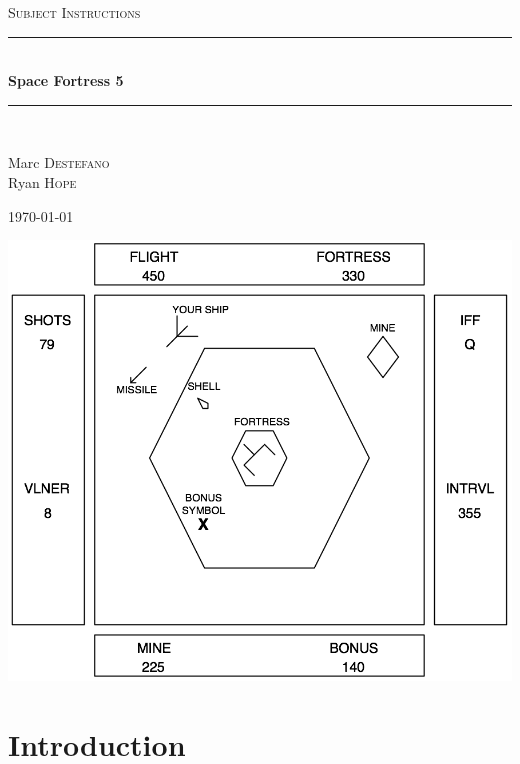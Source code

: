 \documentclass[letterpaper,12pt]{article}
\newcommand{\HRule}{\rule{\linewidth}{0.5mm}}
\begin{document}
\begin{titlepage}
\begin{center}
\null
\vfill
\textsc{\Large Subject Instructions}\\[0.5cm]
\HRule \\[0.7cm]
{ \huge \bfseries Space Fortress 5}\\[0.4cm]
\HRule \\[1.5cm]
\begin{minipage}{0.4\textwidth}
\begin{center} \large
Marc \textsc{Destefano}\\
Ryan \textsc{Hope}
\end{center}
\end{minipage}
\vfill
{\large \today}
\end{center}
\end{titlepage}

\thispagestyle{empty}
\begin{center}
\null
\vfill
\includegraphics[width=\textwidth]{SF5.png}
\vfill
\end{center}
\newpage

\section{Introduction}
\end{document}
